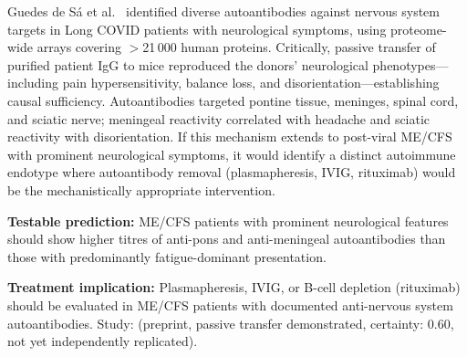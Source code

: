 \begin{hypothesis}
\label{hyp:guedesde-sa2024-autoab-neuro}
Guedes de S\'a et al.~\cite{GuedesDeSa2024} identified diverse autoantibodies against nervous system targets in Long COVID patients with neurological symptoms, using proteome-wide arrays covering $>$21\,000 human proteins. Critically, passive transfer of purified patient IgG to mice reproduced the donors' neurological phenotypes---including pain hypersensitivity, balance loss, and disorientation---establishing causal sufficiency. Autoantibodies targeted pontine tissue, meninges, spinal cord, and sciatic nerve; meningeal reactivity correlated with headache and sciatic reactivity with disorientation. If this mechanism extends to post-viral ME/CFS with prominent neurological symptoms, it would identify a distinct autoimmune endotype where autoantibody removal (plasmapheresis, IVIG, rituximab) would be the mechanistically appropriate intervention.

\textbf{Testable prediction:} ME/CFS patients with prominent neurological features should show higher titres of anti-pons and anti-meningeal autoantibodies than those with predominantly fatigue-dominant presentation.

\textbf{Treatment implication:} Plasmapheresis, IVIG, or B-cell depletion (rituximab) should be evaluated in ME/CFS patients with documented anti-nervous system autoantibodies.
Study: (preprint, passive transfer demonstrated, certainty: 0.60, not yet independently replicated).
\end{hypothesis}

